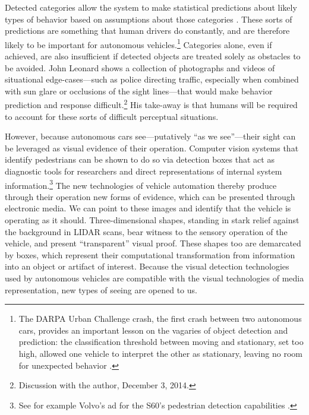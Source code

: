 Detected categories allow the system to make
statistical predictions about likely types of behavior based on
assumptions about those categories
\cite{predictPatent}. These sorts of predictions are 
something that human drivers do constantly, and are therefore
likely to be important for autonomous vehicles.\footnote{The
  DARPA Urban Challenge crash, the first crash between two autonomous
  cars, provides an important lesson on the vagaries of object
  detection and prediction: the classification threshold between moving and
  stationary, set too high, allowed one vehicle to interpret the other
  as stationary, leaving no room for unexpected behavior \cite{collisionPaper}.}
Categories alone, even if achieved, are also insufficient if detected
objects are treated solely as obstacles to be avoided. John Leonard
shows a collection of photographs and videos of situational
edge-cases---such as police  
directing traffic, especially when combined with sun glare or
occlusions of the sight lines---that
would make behavior prediction and response difficult.\footnote{Discussion with the author, December 3,
  2014.} His take-away is that humans will be
required to account for these sorts of difficult perceptual
situations. 



However, because autonomous cars see---putatively ``as we see''---their sight can
be leveraged as visual evidence of their operation. Computer vision
systems that identify 
pedestrians can be shown to do so via detection boxes that act as
diagnostic tools for researchers and direct representations of
internal system information.\footnote{See for example Volvo's ad for
  the S60's pedestrian detection capabilities \cite{volvovideo}.} The new technologies of vehicle
automation thereby produce through 
their operation new forms of evidence, which can be presented through
electronic media. We can point to these images and identify
that the vehicle is operating as it should. Three-dimensional shapes,
standing in stark relief against 
the background in LIDAR scans, bear witness to the sensory operation
of the vehicle, and present ``transparent'' visual proof.
These shapes too are demarcated by boxes, which represent their
computational transformation from information into an object or
artifact of interest. Because the visual detection technologies used
by autonomous vehicles are compatible with the visual technologies of
media representation, new types of seeing are opened to us.


